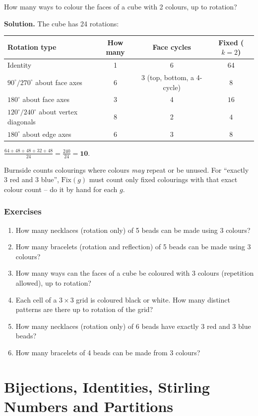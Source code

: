 \documentclass[11pt,a4paper,openany]{report}
\newenvironment{exercises}{\subsection*{Exercises \thechapter}\begin{enumerate}[label=\textbf{\thechapter.\arabic*},leftmargin=3.2em]}{\end{enumerate}}
\begin{document}
\begin{example}[cube]
How many ways to colour the faces of a cube with 2 colours, up to rotation?

\textbf{Solution.} The cube has 24 rotations:
\begin{center}\small
\begin{tabular}{lccc}
\toprule
Rotation type & How many & Face cycles & Fixed ($k=2$)\\\midrule
Identity & 1 & 6 & 64\\
$90^\circ/270^\circ$ about face axes & 6 & 3 (top, bottom, a 4-cycle) & $8$\\
$180^\circ$ about face axes & 3 & 4 & $16$\\
$120^\circ/240^\circ$ about vertex diagonals & 8 & 2 & $4$\\
$180^\circ$ about edge axes & 6 & 3 & $8$\\
\bottomrule
\end{tabular}
\end{center}
$\frac{64+48+48+32+48}{24}=\frac{240}{24}=\mathbf{10}$.
\end{example}

\begin{trap}
Burnside counts colourings where colours \emph{may} repeat or be unused. For ``exactly 3 red and 3 blue'', $\text{Fix}(g)$
must count only fixed colourings with that exact colour count -- do it by hand for each $g$.
\end{trap}

\begin{exercises}
\item How many necklaces (rotation only) of 5 beads can be made using 3 colours?
\item How many bracelets (rotation and reflection) of 5 beads can be made using 3 colours?
\item How many ways can the faces of a cube be coloured with 3 colours (repetition allowed), up to rotation?
\item Each cell of a $3\times3$ grid is coloured black or white. How many distinct patterns are there up to rotation of the grid?
\item How many necklaces (rotation only) of 6 beads have exactly 3 red and 3 blue beads?
\item How many bracelets of 4 beads can be made from 3 colours?
\end{exercises}

\chapter{Bijections, Identities, Stirling Numbers and Partitions}\label{ch:bij}
\end{document}
